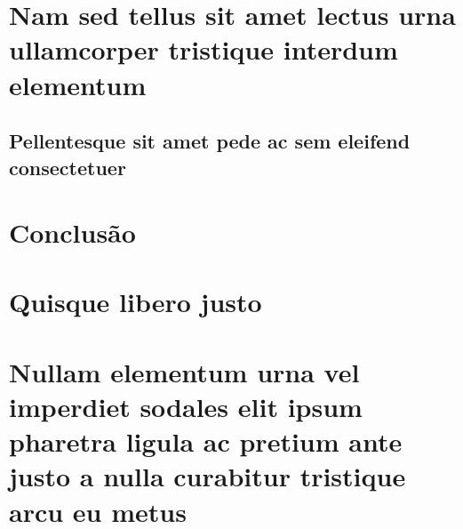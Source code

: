 \documentclass[12pt,openright,twoside,a4paper]{abntex2}
\begin{document}
\chapter{Nam sed tellus sit amet lectus urna ullamcorper tristique interdum
elementum}

\section{Pellentesque sit amet pede ac sem eleifend consectetuer}

\lipsum[24]

% 

\postextual

\chapter*{Conclusão}

\lipsum[31-33]



%
%


\begin{apendicesenv}

\appendixpage

\chapter{Quisque libero justo}

\lipsum[50]

\chapter{Nullam elementum urna vel imperdiet sodales elit ipsum pharetra ligula
ac pretium ante justo a nulla curabitur tristique arcu eu metus}
\lipsum[55-57]

\end{apendicesenv}
\end{document}
